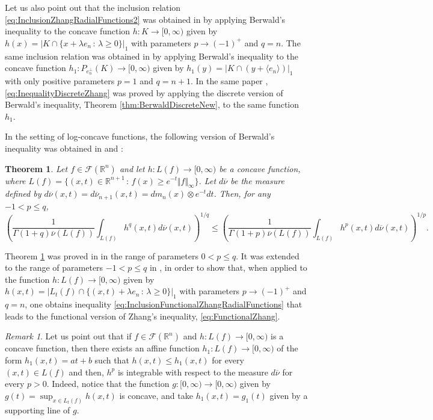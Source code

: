 \documentclass{amsart}
\newcommand{\R}{\mathbb R}
\newtheorem{thm}{Theorem}[section]
\theoremstyle{remark}
\newtheorem{rmk}{Remark}
\theoremstyle{definition}
\numberwithin{equation}{section}
\begin{document}
Let us also point out that the inclusion relation \eqref{eq:InclusionZhangRadialFunctions2} was obtained in \cite{GZ} by applying Berwald's inequality to the concave function $h: K\to[0,\infty)$ given by $h(x)=|K\cap\{x+\lambda e_n\,:\,\lambda\geq0\}|_1$ with parameters $p\to(-1)^+$ and $q=n$. The same inclusion relation was obtained in \cite[Sect. 3]{ALM} by applying Berwald's inequality to the concave function $h_1:P_{e_n^\perp}(K)\to[0,\infty)$ given by $h_1(y)=|K\cap(y+\langle e_n\rangle)|_1$ with only positive parameters $p=1$ and $q=n+1$. In the same paper \cite{ALM}, \eqref{eq:InequalityDiscreteZhang} was proved  by applying the discrete version of Berwald's inequality, Theorem \ref{thm:BerwaldDiscreteNew}, to the same function $h_1$.


In the setting of log-concave functions, the following version of Berwald's inequality was obtained in \cite[Lem. 3.3]{AAGJV} and \cite[Thm. 1.1]{ABG2}:

\begin{thm}\label{thm:FuncBerwald>-1}
Let $f\in\mathcal F(\mathbb R^n)$ and let $h:L(f)\to[0,\infty)$ be a concave function,
where $L(f)=\{(x,t)\in\R^{n+1}\,:\,f(x)\geq e^{-t}\Vert f\Vert_\infty\}$. Let $d\overline{\nu}$ be the measure defined by $d\overline{\nu}(x,t)=d\overline{\nu}_{n+1}(x,t)=dm_n(x)\otimes e^{-t}dt$. Then, for any $-1<p\leq q$,
	$$
	\left(\frac{1}{\Gamma(1+q)\overline{\nu}(L(f))}\int_{L(f)} h^q(x,t)d\overline{\nu}(x,t)\right)^{1/q}\leq\left(\frac{1}{\Gamma(1+p)\overline{\nu}(L(f))}\int_{L(f)} h^p(x,t)d\overline{\nu}(x,t)\right)^{1/p}.
	$$
\end{thm}

Theorem \ref{thm:FuncBerwald>-1} was proved in \cite{AAGJV} in the range of parameters $0<p\leq q$. It was extended to the range of parameters  $-1<p\leq q$ in \cite{ABG2}, in order to show that, when applied to the function
$h:L(f)\to[0,\infty)$ given by $h(x,t)=|L_t(f)\cap\{(x,t)+\lambda e_n\,:\,\lambda\geq0\}|_1$ with parameters $p\to(-1)^+$ and $q=n$, one obtains inequality \eqref{eq:InclusionFunctionalZhangRadialFunctions} that leads to the functional version of Zhang's inequality, \eqref{eq:FunctionalZhang}.

\begin{rmk}\label{rmk:IntegrabilityConcaveFunctionsOnEpigraphs}
Let us point out that if $f\in\mathcal{F}(\R^n)$ and $h:L(f)\to[0,\infty)$ is a concave function, then there exists an affine function $h_1:L(f)\to[0,\infty)$ of the form $h_1(x,t)=at+b$ such that $h(x,t)\leq h_1(x,t)$ for every $(x,t)\in L(f)$ and then, $h^p$ is integrable with respect to the measure $d\overline{\nu}$ for every $p>0$. Indeed, notice that the function $g:[0,\infty)\to[0,\infty)$ given by $\displaystyle{g(t)=\sup_{x\in L_t(f)}h(x,t)}$ is concave, and take $h_1(x,t)=g_1(t)$ given by a supporting line of $g$.
\end{rmk}
\end{document}
